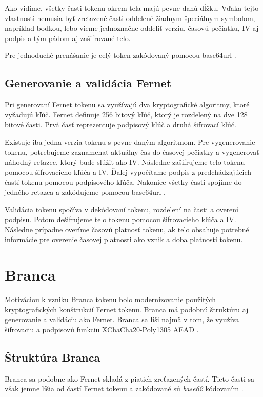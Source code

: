 Ako vidíme, všetky časti tokenu okrem tela majú pevne danú dĺžku. Vďaka tejto vlastnosti nemusia byť zreťazené časti oddelené žiadnym špeciálnym symbolom, napríklad bodkou, lebo vieme jednoznačne oddeliť verziu, časovú pečiatku, IV aj podpis a tým pádom aj zašifrované telo.

Pre jednoduché prenášanie je celý token zakódovaný pomocou base64url \cite{base64_rfc}.

\subsection{Generovanie a validácia Fernet}

Pri generovaní Fernet tokenu sa využívajú dva kryptografické algoritmy, ktoré vyžadujú kľúč. Fernet definuje 256 bitový kľúč, ktorý je rozdelený na dve 128 bitové časti. Prvá časť reprezentuje podpisový kľúč a druhá šifrovací kľúč.

Existuje iba jedna verzia tokenu s pevne daným algoritmom. Pre vygenerovanie tokenu, potrebujeme zaznamenať aktuálny čas do časovej pečiatky a vygenerovať náhodný reťazec, ktorý bude slúžiť ako IV. Následne zašifrujeme telo tokenu pomocou šifrovacieho kľúča a IV. Ďalej vypočítame podpis z predchádzajúcich častí tokenu pomocou podpisového kľúča. Nakoniec všetky časti spojíme do jedného reťazca a zakódujeme pomocou base64url \cite{base64_rfc}.

Validácia tokenu spočíva v dekódovaní tokenu, rozdelení na časti a overení podpisu. Potom dešifrujeme telo tokenu pomocou šifrovacieho kľúča a IV. Následne prípadne overíme časovú platnosť tokenu, ak telo obsahuje potrebné informácie pre overenie časovej platnosti ako vznik a doba platnosti tokenu.

\section{Branca}

Motiváciou k vzniku Branca tokenu \cite{branca_spec} bolo modernizovanie použitých kryptografických konštrukcií Fernet tokenu. Branca má podobnú štruktúru aj generovanie a validáciu ako Fernet. Branca sa líši najmä v tom, že využíva šifrovaciu a podpisovú funkciu XChaCha20-Poly1305 AEAD \cite{chacha_poly}.

\subsection{Štruktúra Branca}

Branca sa podobne ako Fernet skladá z piatich zreťazených častí. Tieto časti sa však jemne líšia od častí Fernet tokenu a zakódované sú \textit{base62} kódovaním \cite{base62}.

